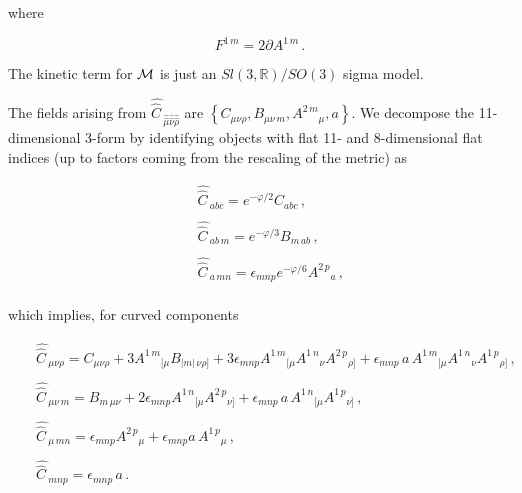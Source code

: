 \documentclass[12pt,a4paper]{article}
\begin{document}
\noindent where 

\begin{equation}
\label{eq:fieldstrength1}
F^{1\, m} = 2\partial A^{1\, m}\, .  
\end{equation}

The kinetic term for ${\cal M}$ is just an $Sl(3,\mathbb{R})/SO(3)$
sigma model.

\noindent The fields arising from 
$\hat{\hat{C} \,}_{\hat{\hat{\mu}}\hat{\hat{\nu}}\hat{\hat{\rho}}}$
are $\left\{ C_{\mu\nu\rho}, B_{\mu\nu\, m}, A^{2\, m}{}_{\mu}, a
\right\}$.  We decompose the 11-dimensional 3-form by identifying objects
with flat 11- and 8-dimensional flat indices (up to factors coming
from the rescaling of the metric) as

\begin{equation}
\label{eq:3formpotentialflat}
\begin{array}{rcl}
&& \hat{\hat{C} \,}_{abc} = e^{-\varphi/2} C_{abc}\, ,\\ 
 & & \\
&& \hat{\hat{C} \,}_{ab\, m} = 
e^{-\varphi/3}B_{m\, ab}\, ,\\
 & & \\
&& \hat{\hat{C} \,}_{a\, mn} = 
\epsilon_{mnp} e^{-\varphi/6}A^{2\, p}{}_{a}\, ,\\ 
\end{array}
\end{equation}

\noindent which implies, for curved components

\begin{equation}
\label{eq:3formpotential}
\begin{array}{rcl}
&& \hat{\hat{C} \,}_{\mu\nu\rho} = 
C_{\mu\nu\rho} 
+3A^{1\, m}{}_{[\mu}B_{|m|\,\nu\rho]} 
+3\epsilon_{mnp} A^{1\, m}{}_{[\mu} A^{1\, n}{}_{\nu} A^{2\, p}{}_{\rho]}
+\epsilon_{mnp}\, a\, 
A^{1\, m}{}_{[\mu} A^{1\, n}{}_{\nu} A^{1\, p}{}_{\rho]}\, ,\\
 & & \\
&& \hat{\hat{C} \,}_{\mu\nu\, m} = 
B_{m\, \mu\nu}
+2\epsilon_{mnp} A^{1\, n}{}_{[\mu} A^{2\, p}{}_{\nu]}
+\epsilon_{mnp}\, a\, A^{1\, n}{}_{[\mu} A^{1\, p}{}_{\nu]}\, ,\\
 & & \\
&& \hat{\hat{C} \,}_{\mu\, mn} = 
\epsilon_{mnp} A^{2\, p}{}_{\mu} 
+\epsilon_{mnp} a\, A^{1\, p}{}_{\mu}\, , \\
 & & \\
&& \hat{\hat{C} \,}_{mnp} = \epsilon_{mnp}\, a\, .\\
 & & \\
\end{array}
\end{equation}
\end{document}
